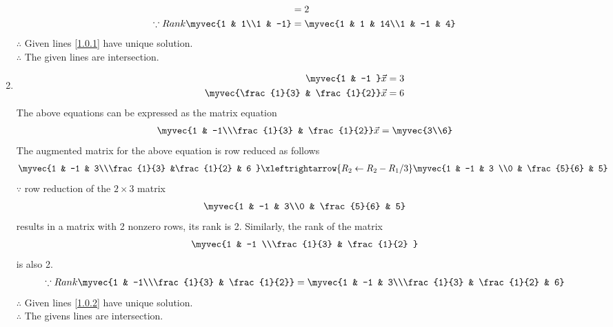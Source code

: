 \documentclass[journal,12pt,twocolumn]{IEEEtran}
\begin{document}
\begin{enumerate}
\begin{align}
 &=2
 \\
\because Rank \myvec{1 & 1\\1 & -1} &=\myvec{1 & 1 & 14\\1 & -1 & 4}\nonumber\\
\end{align}
$\therefore$ Given lines \eqref{1.0.1} have unique solution.
\\
$\therefore$ The given lines are intersection. 
\item
\begin{align}
\begin{split}
\myvec{1 & -1 }\vec{x}&=3  
\\
\myvec{\frac{1}{3} & \frac{1}{2}}\vec{x}&=6
\end{split}
\end{align}
The above equations can be expressed as the matrix equation
\begin{align}
\myvec{1 & -1\\\frac{1}{3} & \frac{1}{2}} \vec{x} = \myvec{3\\6}
\end{align}
%
The augmented matrix for the above equation is row reduced as follows
\begin{align}
\myvec{1 & -1 & 3\\\frac{1}{3} &\frac{1}{2} & 6 }
\xleftrightarrow {R_2\leftarrow R_2-R_1/3}\myvec{1 & -1 & 3 \\0 & \frac{5}{6} & 5}
\\
\end{align}
%
$\because$ row reduction of the $2\times 3$ matrix
%
\begin{align}
\myvec{1 & -1 & 3\\0 & \frac{5}{6} & 5}
\end{align}
%
results in a matrix with 2 nonzero rows, its rank is 2. 
%
Similarly, the rank of the matrix 
\begin{align}
\myvec{1 & -1 \\\frac{1}{3} & \frac{1}{2} } 
\end{align}
%
is also 2.
%
\begin{align}
\because Rank \myvec{1 & -1\\\frac{1}{3} & \frac{1}{2}} &=\myvec{1 & -1 & 3\\\frac{1}{3} & \frac{1}{2} & 6}\nonumber\\
\end{align}
$\therefore$ Given lines \eqref{1.0.2} have unique solution.
\\
$\therefore$ The givens lines are intersection. 

\end{enumerate}
\end{document}
